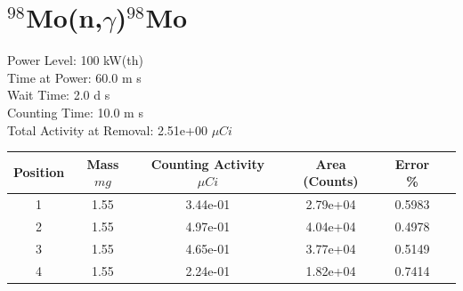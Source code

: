 \newpage

\section*{ $^{98}$Mo(n,$\gamma$)$^{98}$Mo }

Power Level: 100 kW(th) \\
Time at Power: 60.0 m s \\
Wait Time:  2.0 d s \\
Counting Time: 10.0 m s \\
Total Activity at Removal: 2.51e+00 $\mu Ci$

\begin{table}[h]
\centering
\begin{tabular}{ |c|c|c|c|c|c| }
 \hline
 Position & Mass $mg$ & Counting Activity $\mu Ci$ & Area (Counts) & Error \% \\
 \hline 
 1 & 1.55 & 3.44e-01 & 2.79e+04 & 0.5983 \\ 
\hline
 2 & 1.55 & 4.97e-01 & 4.04e+04 & 0.4978 \\ 
\hline
 3 & 1.55 & 4.65e-01 & 3.77e+04 & 0.5149 \\ 
\hline
 4 & 1.55 & 2.24e-01 & 1.82e+04 & 0.7414 \\ 
\hline
\end{tabular}
\end{table}

